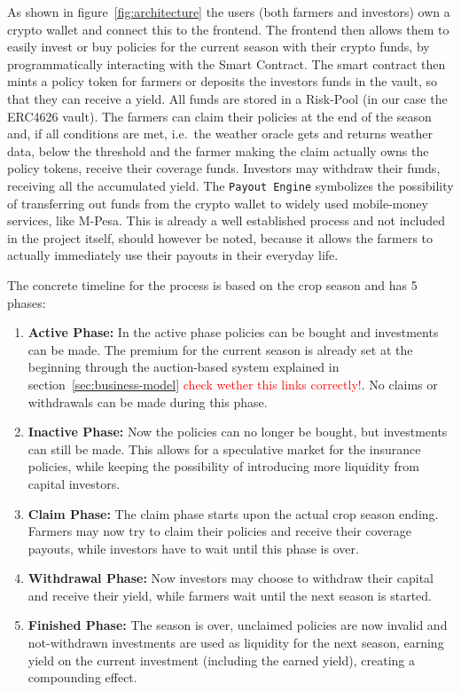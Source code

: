 \documentclass[11pt,a4paper]{article}
\begin{document}
	As shown in figure~\ref{fig:architecture} the users (both farmers and investors) own a crypto wallet and connect this to the frontend.
	The frontend then allows them to easily invest or buy policies for the current season with their crypto funds, by programmatically interacting with the Smart Contract.
	The smart contract then mints a policy token for farmers or deposits the investors funds in the vault, so that they can receive a yield.
	All funds are stored in a Risk-Pool (in our case the ERC4626 vault).
	The farmers can claim their policies at the end of the season and, if all conditions are met, i.e.\ the weather oracle gets and returns weather data, below the threshold and the farmer making the claim actually owns the policy tokens, receive their coverage funds.
	Investors may withdraw their funds, receiving all the accumulated yield.
	The \texttt{Payout Engine} symbolizes the possibility of transferring out funds from the crypto wallet to widely used mobile-money services, like M-Pesa.
	This is already a well established process and not included in the project itself, should however be noted, because it allows the farmers to actually immediately use their payouts in their everyday life.

	The concrete timeline for the process is based on the crop season and has 5 phases:
	\begin{enumerate}
		\item \textbf{Active Phase:} In the active phase policies can be bought and investments can be made.
			The premium for the current season is already set at the beginning through the auction-based system explained in section~\ref{sec:business-model} \textcolor{red}{check wether this links correctly!}.
			No claims or withdrawals can be made during this phase.
		\item \textbf{Inactive Phase:} Now the policies can no longer be bought, but investments can still be made.
			This allows for a speculative market for the insurance policies, while keeping the possibility of introducing more liquidity from capital investors.
		\item \textbf{Claim Phase:} The claim phase starts upon the actual crop season ending.
			Farmers may now try to claim their policies and receive their coverage payouts, while investors have to wait until this phase is over.
		\item \textbf{Withdrawal Phase:} Now investors may choose to withdraw their capital and receive their yield, while farmers wait until the next season is started.
		\item \textbf{Finished Phase:} The season is over, unclaimed policies are now invalid and not-withdrawn investments are used as liquidity for the next season, earning yield on the current investment (including the earned yield), creating a compounding effect.
        \label{enum:phases}
	\end{enumerate}
\end{document}

